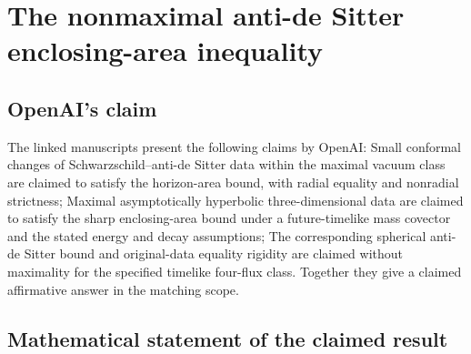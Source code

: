 \documentclass[11pt]{article}
\begin{document}
\section*{The nonmaximal anti-de Sitter enclosing-area inequality}

\subsection{OpenAI's claim}
The linked manuscripts present the following claims by OpenAI: Small conformal changes of Schwarzschild--anti-de Sitter data within the maximal vacuum class are claimed to satisfy the horizon-area bound, with radial equality and nonradial strictness; Maximal asymptotically hyperbolic three-dimensional data are claimed to satisfy the sharp enclosing-area bound under a future-timelike mass covector and the stated energy and decay assumptions; The corresponding spherical anti-de Sitter bound and original-data equality rigidity are claimed without maximality for the specified timelike four-flux class. Together they give a claimed affirmative answer in the matching scope.

\subsection{Mathematical statement of the claimed result}
\end{document}
